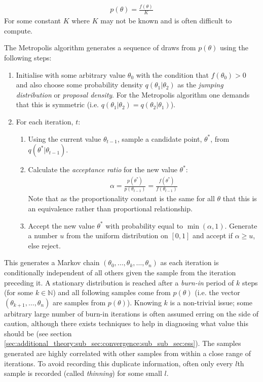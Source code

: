 \documentclass[14pt]{extarticle} %
\begin{document}
\begin{align}
p(\theta) = \frac{f(\theta)}{K} 
\end{align}
For some constant $K$ where $K$ may not be known and is often difficult to compute.

The Metropolis algorithm \citep{MetropolisMonteCarloMethod1949, MetropolisEquationStateCalculations1953} generates a sequence of draws from $p(\theta)$ using the following steps:

\begin{enumerate}
	\item Initialise with some arbitrary value $\theta_0$ with the condition that $f(\theta_0) > 0$ and also choose some probability density $q(\theta_1|\theta_2)$ as the \emph{jumping distribution} or \emph{proposal density}. For the Metropolis algorithm one demands that this is symmetric (i.e. $q(\theta_1 | \theta_2) = q(\theta_2 | \theta_1)$).
	\item For each iteration, $t$:
	\begin{enumerate}
		\item Using the current value $\theta_{t-1}$, sample a candidate point, $\theta^*$, from  $q(\theta^* | \theta_{t-1})$.
		\item Calculate the \emph{acceptance ratio} for the new value $\theta^*$:
		\begin{align}
		\alpha = \frac{p(\theta^*)}{p(\theta_{t-1})} = \frac{f(\theta^*)}{f(\theta_{t-1})}
		\end{align}
		Note that as the proportionality constant is the same for all $\theta$ that this is an equivalence rather than proportional relationship.
		\item Accept the new value $\theta^*$ with probability equal to $\min(\alpha, 1)$. Generate a number $u$ from the uniform distribution on $[0,1]$ and accept if $\alpha \geq u$, else reject.
	\end{enumerate}
\end{enumerate}
This generates a Markov chain $(\theta_0,\ldots,\theta_k,\ldots, \theta_n)$ as each iteration is conditionally independent of all others given the sample from the iteration preceding it. A stationary distribution is reached after a \emph{burn-in} period of $k$ steps (for some $k \in \mathbb{N}$) and all following samples come from $p(\theta)$ (i.e. the vector $(\theta_{k+1},\ldots,\theta_n)$ are samples from $p(\theta)$). Knowing $k$ is a non-trivial issue; some arbitrary large number of burn-in iterations is often assumed erring on the side of caution, although there exists techniques to help in diagnosing what value this should be (see section \ref{sec:additional_theory:sub_sec:convergence:sub_sub_sec:ess}). The samples generated are highly correlated with other samples from within a close range of iterations. To avoid recording this duplicate information, often only every $l$th sample is recorded (called \emph{thinning}) for some small $l$.
\end{document}
